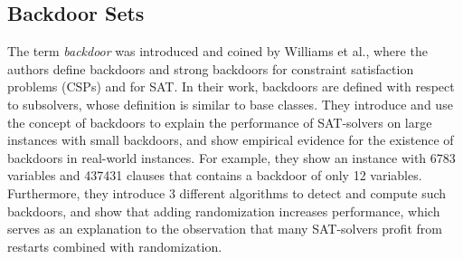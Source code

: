 \documentclass[11pt,a4paper]{article}
\theoremstyle{definition}
\theoremstyle{proposition}
\begin{document}
\subsection{Backdoor Sets}
The term \textit{backdoor} was introduced and coined by Williams et al.\cite{typicalCaseComplexity}, where the authors define backdoors and strong backdoors for constraint satisfaction problems (CSPs) and for SAT. In their work, backdoors are defined with respect to subsolvers, whose definition is similar to base classes. They introduce and use the concept of backdoors to explain the performance of SAT-solvers on large instances with small backdoors, and show empirical evidence for the existence of backdoors in real-world instances. For example, they show an instance with 6783 variables and 437431 clauses that contains a backdoor of only 12 variables. Furthermore, they introduce 3 different algorithms to detect and compute such backdoors, and show that adding randomization increases performance, which serves as an explanation to the observation that many SAT-solvers profit from restarts combined with randomization. 
\end{document}
